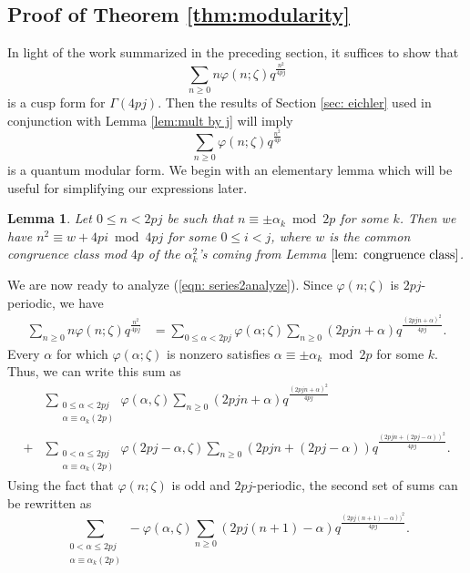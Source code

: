 \documentclass[11pt,letterpaper]{amsart}
\theoremstyle{definition}
\theoremstyle{plain}
\newtheorem{lemma}[theorem]{Lemma}
\numberwithin{equation}{section}
\theoremstyle{example}
\begin{document}
\subsection{Proof of Theorem \ref{thm:modularity}}
In light of the work summarized in the preceding section, it suffices to show that \begin{equation} \label{eqn: series2analyze} \sum_{n \geq 0} n \varphi(n;\zeta) q^\frac{n^2}{4pj}\end{equation}
is a cusp form for $\Gamma(4pj)$.
Then the results of Section \ref{sec: eichler} used in conjunction with Lemma \ref{lem:mult by j} will imply 
\[\sum_{n \geq 0} \varphi(n;\zeta) q^\frac{n^2}{4p}\]
is a quantum modular form.
We begin with an elementary lemma which will be useful for simplifying our expressions later. 
\begin{lemma} \label{lem: congruence mod 4pj}
Let $0 \leq n < 2pj$ be such that $n \equiv \pm \alpha_k \bmod{2p}$ for some $k$. Then we have $n^2 \equiv w + 4pi \bmod{4pj}$ for some $0 \leq i < j$, where $w$ is the common congruence class mod $4p$ of the $\alpha_k^2$'s coming from Lemma $\ref{lem: congruence class}$. 
\end{lemma}
We are now ready to analyze (\ref{eqn: series2analyze}).
Since $\varphi(n;\zeta)$ is $2pj$-periodic, we have
\begin{align*}
\sum_{n \geq 0} n \varphi(n;\zeta) q^\frac{n^2}{4pj} 
&= \sum_{0 \leq \alpha < 2pj} \varphi(\alpha; \zeta) \sum_{n \geq 0} (2pjn+\alpha)q^\frac{(2pjn+\alpha)^2}{4pj}.
\end{align*}
Every $\alpha$ for which $\varphi(\alpha;\zeta)$ is nonzero satisfies $\alpha \equiv \pm \alpha_k \bmod{2p}$ for some $k$.
Thus, we can write this sum as
\begin{align*}  & \sum_{\substack{0 \leq \alpha < 2pj \\ \alpha \equiv \alpha_k (2p)}} \varphi(\alpha, \zeta)  \sum_{n \geq 0} (2pjn+\alpha)q^\frac{(2pjn+\alpha)^2}{4pj} \\ + &\sum_{\substack{0 < \alpha \leq 2pj \\ \alpha \equiv \alpha_k (2p)}} \varphi(2pj - \alpha, \zeta) \sum_{n \geq 0} (2pjn+(2pj-\alpha))q^\frac{(2pjn+(2pj-\alpha))^2}{4pj}.\end{align*}
Using the fact that $\varphi(n;\zeta)$ is odd and $2pj$-periodic, the second set of sums can be rewritten as
\[\sum_{\substack{0 < \alpha \leq 2pj \\ \alpha \equiv \alpha_k (2p)}} -\varphi(\alpha, \zeta) \sum_{n \geq 0} (2pj(n+1)-\alpha)q^\frac{(2pj(n+1)-\alpha))^2}{4pj}.\]
\end{document}
